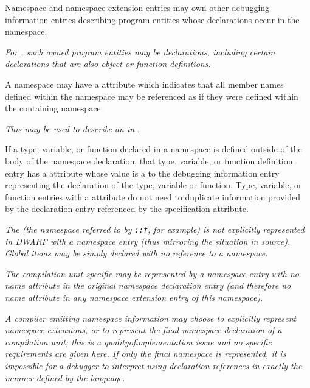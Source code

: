 Namespace and namespace extension entries may own 
other
debugging information entries describing program entities
whose declarations occur in the namespace.

\textit{For , such 
owned program entities may be declarations,
including certain declarations that are also object or
function definitions.}

A namespace may have a 
\DWATexportsymbolsNAME{}
attribute
which indicates that all member names defined within the 
namespace may be referenced as if they were defined within 
the containing namespace. 

\textit{This may be used to describe an  in }.

If a type, variable, or function declared in a namespace is
defined outside of the body of the namespace declaration,
that type, variable, or function definition entry has a
\DWATspecification{} attribute 
whose value is a  to the
debugging information entry representing the declaration of
the type, variable or function. Type, variable, or function
entries with a 
\DWATspecification{} attribute 
do not need
to duplicate information provided by the declaration entry
referenced by the specification attribute.

\textit{The  
(the 
namespace 
referred to by
\texttt{::f}, for example) is not explicitly represented in
DWARF with a namespace entry (thus mirroring the situation
in  source).  
Global items may be simply declared with no
reference to a namespace.}

\textit{The  
compilation unit specific  may
be represented by a namespace entry with no name attribute in
the original namespace declaration entry (and therefore no name
attribute in any namespace extension entry of this namespace).
}

\textit{A compiler emitting namespace information may choose to
explicitly represent namespace extensions, or to represent the
final namespace declaration of a compilation unit; this is a
quality\dash of\dash implementation issue and no specific requirements
are given here. If only the final namespace is represented,
it is impossible for a debugger to interpret using declaration
references in exactly the manner defined by the 
 language.
}

